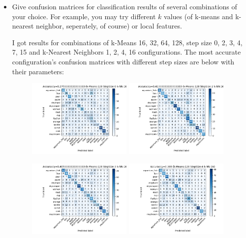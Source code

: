 \documentclass[12pt]{article}
\begin{document}
\begin{itemize}
        \item Give confusion matrices for classification results of several combinations of your choice. For example, you may try different $k$ values (of k-means and k-nearest neighbor, seperately, of course) or local features.

		I got results for combinations of k-Means 16, 32, 64, 128, step size 0, 2, 3, 4, 7, 15 and k-Nearest Neighbors 1, 2, 4, 16 configurations. The most accurate configuration's confusion matrices with different step sizes are below with their parameters:

        \begin{figure}[!h]
			\centering
			\includegraphics[width=0.48\textwidth]{Figure_1-0.png}
			\includegraphics[width=0.48\textwidth]{Figure_1-1.png}
		\end{figure}
        \begin{figure}[!h]
			\centering
			\includegraphics[width=0.48\textwidth]{Figure_1-2.png}
			\includegraphics[width=0.48\textwidth]{Figure_1-3.png}

\end{figure}
\end{itemize}
\end{document}
